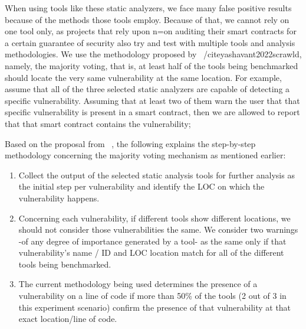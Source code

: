     When using tools like these static analyzers, we face many false positive results because of the methods those tools employ.
    Because of that, we cannot rely on one tool only, as projects that rely upon n=on auditing their smart contracts for a certain guarantee of security also try and test with multiple tools and analysis methodologies.
    We use the methodology proposed by ~/cite{yashavant2022scrawld}, namely, the majority voting, that is, at least half of the tools being benchmarked should locate the very same vulnerability at the same location.
    For example, assume that all of the three selected static analyzers are capable of detecting a specific vulnerability.
    Assuming that at least two of them warn the user that that specific vulnerability is present in a smart contract, then we are allowed to report that that smart contract contains the vulnerability;
    
    Based on the proposal from ~\cite{yashavant2022scrawld}, the following explains the step-by-step methodology concerning the majority voting mechanism as mentioned earlier:
    
    \begin{enumerate}
    
    \item Collect the output of the selected static analysis tools for further analysis as the initial step per vulnerability and identify the LOC on which the vulnerability happens.
    
    \item Concerning each vulnerability, if different tools show different locations, we should not consider those vulnerabilities the same.
        We consider two warnings -of any degree of importance generated by a tool- as the same only if that vulnerability's name / ID and LOC location match for all of the different tools being benchmarked.
    
    \item The current methodology being used determines the presence of a vulnerability on a line of code if more than 50\% of the tools (2 out of 3 in this experiment scenario) confirm the presence of that vulnerability at that exact location/line of code.
    
    \end{enumerate}
    
